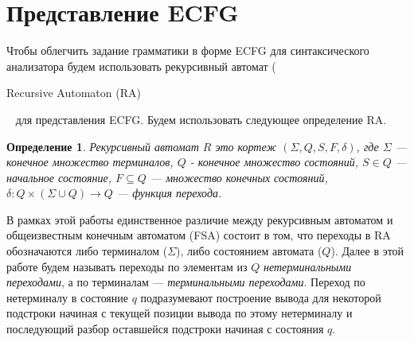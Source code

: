 \documentclass[12pt]{matmex-diploma-custom}
\newtheorem{mydef}{Определение}
\begin{document}
	\section{Представление ECFG}
	
	Чтобы облегчить задание грамматики в форме ECFG для синтаксического анализатора
	будем использовать рекурсивный автомат (\begin{english} Recursive Automaton (RA)\end{english}~\cite{tellier2006learning}
	для представления ECFG. Будем использовать следующее определение RA.
	\begin{mydef}
		Рекурсивный автомат $R$ это кортеж $(\Sigma, Q, S, F, \delta)$, где $\Sigma$
		--- конечное множество терминалов, $Q$ - конечное множество состояний, $S \in Q$ 
		--- начальное состояние, $F \subseteq Q$ --- множество конечных состояний,
		$\delta : Q \times (\Sigma \cup Q) \to Q$ --- функция перехода.
	\end{mydef}
	В рамках этой работы единственное различие между рекурсивным автоматом и общеизвестным
	конечным автоматом (FSA) состоит в том, что переходы в RA обозначаются либо терминалом ($\Sigma$),
	либо состоянием автомата ($Q$). Далее в этой работе будем называть переходы по элементам из
	$Q$ \textit{нетерминальными переходами}, а по терминалам --- \textit{терминальными переходами}.
    Переход по нетерминалу в состояние $q$ подразумевают построение вывода для некоторой подстроки начиная с текущей позиции
    вывода по этому нетерминалу и последующий разбор оставшейся подстроки начиная с состояния $q$.
     
\end{document}
